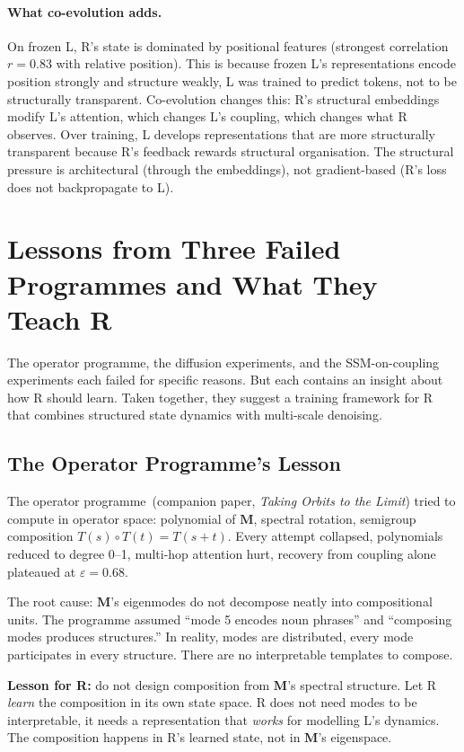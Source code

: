 \documentclass[11pt, a4paper]{article}
\newcommand{\M}{\mathbf{M}}
\theoremstyle{plain}
\theoremstyle{definition}
\theoremstyle{remark}
\begin{document}
\paragraph{What co-evolution adds.}
On frozen L, R's state is dominated by positional features (strongest correlation $r = 0.83$ with relative position).
This is because frozen L's representations encode position strongly and structure weakly, L was trained to predict tokens, not to be structurally transparent.
Co-evolution changes this: R's structural embeddings modify L's attention, which changes L's coupling, which changes what R observes.
Over training, L develops representations that are more structurally transparent because R's feedback rewards structural organisation.
The structural pressure is architectural (through the embeddings), not gradient-based (R's loss does not backpropagate to L).


\section{Lessons from Three Failed Programmes and What They Teach R}
\label{app:lessons}

The operator programme, the diffusion experiments, and the SSM-on-coupling experiments each failed for specific reasons.
But each contains an insight about how R should learn.
Taken together, they suggest a training framework for R that combines structured state dynamics with multi-scale denoising.

\subsection{The Operator Programme's Lesson}

The operator programme~(companion paper, \emph{Taking Orbits to the Limit}) tried to compute in operator space: polynomial of $\M$, spectral rotation, semigroup composition $T(s) \circ T(t) = T(s+t)$.
Every attempt collapsed, polynomials reduced to degree 0--1, multi-hop attention hurt, recovery from coupling alone plateaued at $\varepsilon = 0.68$.

The root cause: $\M$'s eigenmodes do not decompose neatly into compositional units.
The programme assumed ``mode 5 encodes noun phrases'' and ``composing modes produces structures.''
In reality, modes are distributed, every mode participates in every structure.
There are no interpretable templates to compose.

\textbf{Lesson for R:} do not design composition from $\M$'s spectral structure.
Let R \emph{learn} the composition in its own state space.
R does not need modes to be interpretable, it needs a representation that \emph{works} for modelling L's dynamics.
The composition happens in R's learned state, not in $\M$'s eigenspace.
\end{document}
